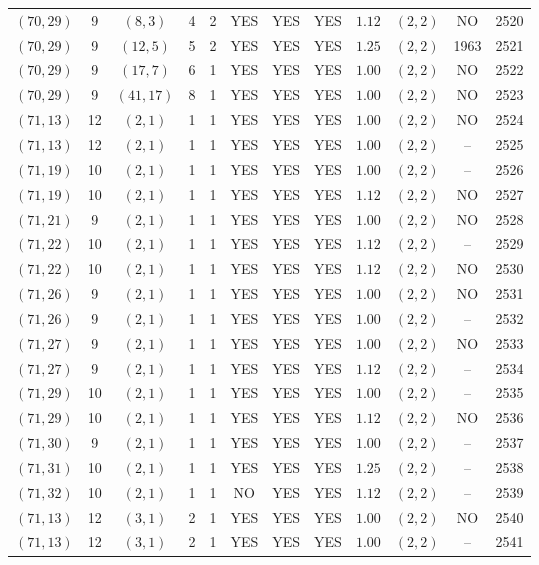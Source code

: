 \begin{longtable}{|c|c|c|c|c|c|c|c|c|c|c|c|}
$(70,29)$ & 9 & $(8,3)$ & 4 & 2 & YES & YES & YES & $1.12$ & $(2,2)$ & NO & 2520\\
$(70,29)$ & 9 & $(12,5)$ & 5 & 2 & YES & YES & YES & $1.25$ & $(2,2)$ & 1963 & 2521\\
$(70,29)$ & 9 & $(17,7)$ & 6 & 1 & YES & YES & YES & $1.00$ & $(2,2)$ & NO & 2522\\
$(70,29)$ & 9 & $(41,17)$ & 8 & 1 & YES & YES & YES & $1.00$ & $(2,2)$ & NO & 2523\\
$(71,13)$ & 12 & $(2,1)$ & 1 & 1 & YES & YES & YES & $1.00$ & $(2,2)$ & NO & 2524\\
$(71,13)$ & 12 & $(2,1)$ & 1 & 1 & YES & YES & YES & $1.00$ & $(2,2)$ & -- & 2525\\
$(71,19)$ & 10 & $(2,1)$ & 1 & 1 & YES & YES & YES & $1.00$ & $(2,2)$ & -- & 2526\\
$(71,19)$ & 10 & $(2,1)$ & 1 & 1 & YES & YES & YES & $1.12$ & $(2,2)$ & NO & 2527\\
$(71,21)$ & 9 & $(2,1)$ & 1 & 1 & YES & YES & YES & $1.00$ & $(2,2)$ & NO & 2528\\
$(71,22)$ & 10 & $(2,1)$ & 1 & 1 & YES & YES & YES & $1.12$ & $(2,2)$ & -- & 2529\\
$(71,22)$ & 10 & $(2,1)$ & 1 & 1 & YES & YES & YES & $1.12$ & $(2,2)$ & NO & 2530\\
$(71,26)$ & 9 & $(2,1)$ & 1 & 1 & YES & YES & YES & $1.00$ & $(2,2)$ & NO & 2531\\
$(71,26)$ & 9 & $(2,1)$ & 1 & 1 & YES & YES & YES & $1.00$ & $(2,2)$ & -- & 2532\\
$(71,27)$ & 9 & $(2,1)$ & 1 & 1 & YES & YES & YES & $1.00$ & $(2,2)$ & NO & 2533\\
$(71,27)$ & 9 & $(2,1)$ & 1 & 1 & YES & YES & YES & $1.12$ & $(2,2)$ & -- & 2534\\
$(71,29)$ & 10 & $(2,1)$ & 1 & 1 & YES & YES & YES & $1.00$ & $(2,2)$ & -- & 2535\\
$(71,29)$ & 10 & $(2,1)$ & 1 & 1 & YES & YES & YES & $1.12$ & $(2,2)$ & NO & 2536\\
$(71,30)$ & 9 & $(2,1)$ & 1 & 1 & YES & YES & YES & $1.00$ & $(2,2)$ & -- & 2537\\
$(71,31)$ & 10 & $(2,1)$ & 1 & 1 & YES & YES & YES & $1.25$ & $(2,2)$ & -- & 2538\\
$(71,32)$ & 10 & $(2,1)$ & 1 & 1 & NO & YES & YES & $1.12$ & $(2,2)$ & -- & 2539\\
$(71,13)$ & 12 & $(3,1)$ & 2 & 1 & YES & YES & YES & $1.00$ & $(2,2)$ & NO & 2540\\
$(71,13)$ & 12 & $(3,1)$ & 2 & 1 & YES & YES & YES & $1.00$ & $(2,2)$ & -- & 2541\\

\end{longtable}
